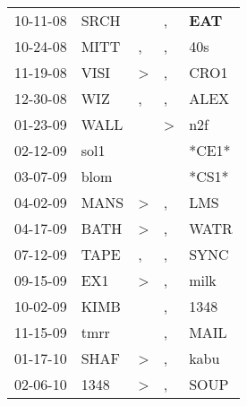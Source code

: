 \begin{supertabular}{p{0.07\textwidth}p{0.06\textwidth}p{0.02\textwidth}p{0.02\textwidth}p{0.06\textwidth}}
          10-11-08\textsuperscript{} &           SRCH\textsuperscript{} &                  &             , &   \textbf{EAT\textsuperscript{}} \\
          10-24-08\textsuperscript{} &           MITT\textsuperscript{} &                , &             , &            40s\textsuperscript{} \\
          11-19-08\textsuperscript{} &           VISI\textsuperscript{} &     \textgreater &             , &           CRO1\textsuperscript{} \\
          12-30-08\textsuperscript{} &            WIZ\textsuperscript{} &                , &             , &           ALEX\textsuperscript{} \\
          01-23-09\textsuperscript{} &           WALL\textsuperscript{} &                  &  \textgreater &            n2f\textsuperscript{} \\
          02-12-09\textsuperscript{} &           sol1\textsuperscript{} &                  &               &                            *CE1* \\
          03-07-09\textsuperscript{} &           blom\textsuperscript{} &                  &               &                            *CS1* \\
          04-02-09\textsuperscript{} &           MANS\textsuperscript{} &     \textgreater &             , &            LMS\textsuperscript{} \\
          04-17-09\textsuperscript{} &           BATH\textsuperscript{} &     \textgreater &             , &           WATR\textsuperscript{} \\
          07-12-09\textsuperscript{} &           TAPE\textsuperscript{} &                , &             , &           SYNC\textsuperscript{} \\
          09-15-09\textsuperscript{} &            EX1\textsuperscript{} &     \textgreater &             , &           milk\textsuperscript{} \\
          10-02-09\textsuperscript{} &           KIMB\textsuperscript{} &                  &             , &           1348\textsuperscript{} \\
          11-15-09\textsuperscript{} &           tmrr\textsuperscript{} &                  &             , &           MAIL\textsuperscript{} \\
          01-17-10\textsuperscript{} &           SHAF\textsuperscript{} &     \textgreater &             , &           kabu\textsuperscript{} \\
          02-06-10\textsuperscript{} &           1348\textsuperscript{} &     \textgreater &             , &           SOUP\textsuperscript{} \\

\end{supertabular}
